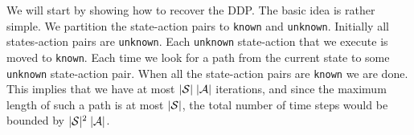 %
%
%
%
%
%
%

We will start by showing how to recover the DDP. The basic idea is
rather simple. We partition the state-action pairs to \texttt{known}
and \texttt{unknown}. Initially all states-action pairs are \texttt{unknown}.
Each \texttt{unknown} state-action that we execute is moved to \texttt{known}. Each
time we look for a path from the current state to some \texttt{unknown}
state-action pair. When all the state-action pairs are \texttt{known} we are
done. This implies that we have at most $|\mathcal{S}|\;|\mathcal{A}|$
iterations, and since the maximum length of such a path is at most
$|\mathcal{S}|$, the total number of time steps would be bounded by
$|\mathcal{S}|^2\;|\mathcal{A}|$.

